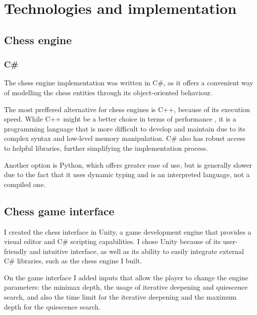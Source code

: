 \chapter{Technologies and implementation}
\label{chap:ch5}

\section{Chess engine}
\label{sec:ch5sec1}

\subsection{C\#}
\label{subsec:ch5sec1subsec1}

The chess engine implementation was written in C\#, as it offers a convenient way of modelling the chess entities through its object-oriented behaviour.

The most preffered alternative for chess engines is C++, because of its execution speed. While C++ might be a better choice in terms of performance \cite{ogala2020comparative}, it is a programming language that is more difficult to develop and maintain due to its complex syntax and low-level memory manipulation. C\# also has robust access to helpful libraries, further simplifying the implementation process.

Another option is Python, which offers greater ease of use, but is generally slower due to the fact that it uses dynamic typing and is an interpreted language, not a compiled one.

\section{Chess game interface}
\label{sec:ch5sec2}

I created the chess interface in Unity, a game development engine that provides a visual editor and C\# scripting capabilities. I chose Unity because of its user-friendly and intuitive interface, as well as its ability to easily integrate external C\# libraries, such as the chess engine I built.

On the game interface I added inputs that allow the player to change the engine parameters: the minimax depth, the usage of iterative deepening and quiescence search, and also the time limit for the iterative deepening and the maximum depth for the quiescence search.